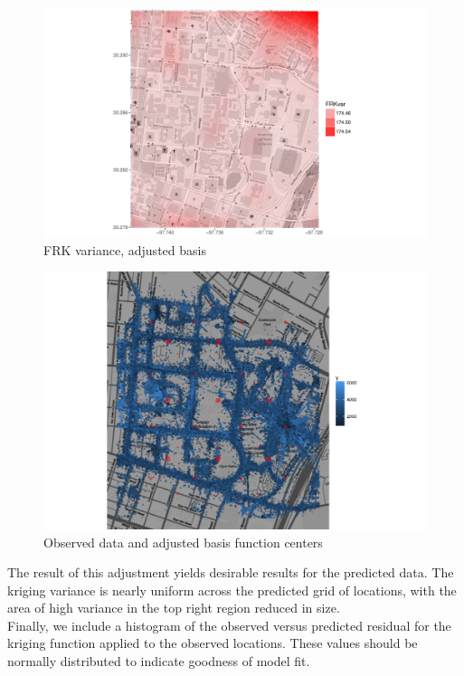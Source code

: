\documentclass[11pt]{article}
\begin{document}
\begin{figure}[h!]
\centering
\includegraphics[width=160mm,keepaspectratio]{Images/var_newgrid.pdf}
\caption{FRK variance, adjusted basis \label{fig:8}}
\end{figure}

\begin{figure}[h!]
\centering
\includegraphics[width=160mm,keepaspectratio]{Images/data_grid_new.png}
\caption{Observed data and adjusted basis function centers \label{fig:9}}
\end{figure}

The result of this adjustment yields desirable results for the predicted data.  The kriging variance is nearly uniform across the predicted grid of locations, with the area of high variance in the top right region reduced in size.\\

Finally, we include a histogram of the observed versus predicted residual for the kriging function applied to the observed locations.  These values should be normally distributed to indicate goodness of model fit.\\
\end{document}
